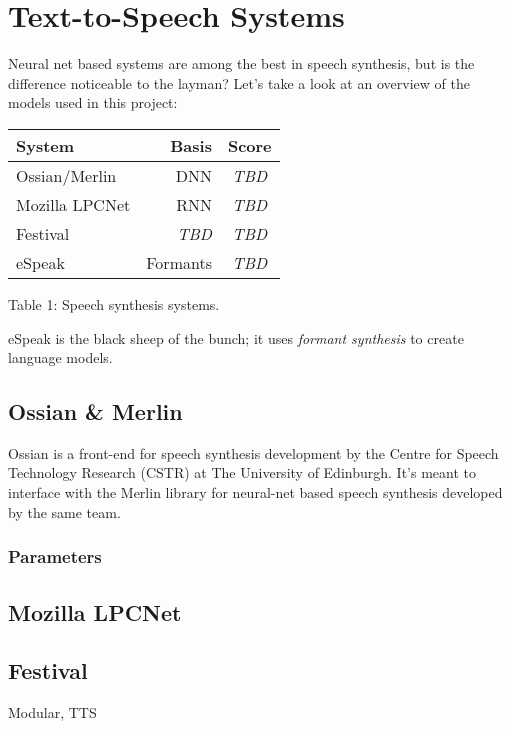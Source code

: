 \documentclass[11pt,a4paper]{article}
\begin{document}
\section{Text-to-Speech Systems}\label{sect:dnn}
Neural net based systems are among the best in speech synthesis, but is the difference noticeable to the layman? Let's take a look at an overview of the models used in this project: %
\begin{center}
	\begin{tabular}{|l|r|c|}
		\hline \bf System & \bf Basis & \bf Score \\ \hline
		Ossian/Merlin & DNN & \textit{TBD} \\
		Mozilla LPCNet & RNN & \textit{TBD} \\
		Festival & \textit{TBD} & \textit{TBD} \\
		eSpeak & Formants & \textit{TBD} \\
		\hline
	\end{tabular}

\label{font-table}Table 1: Speech synthesis systems.
\end{center}

eSpeak is the black sheep of the bunch; it uses \textit{formant synthesis} to create language models.

\subsection{Ossian \& Merlin}\label{ssec:ossian}
Ossian is a front-end for speech synthesis development by the Centre for Speech Technology Research (CSTR) at The University of Edinburgh. It's meant to interface with the Merlin library for neural-net based speech synthesis developed by the same team.

\subsubsection{Parameters}

\subsection{Mozilla LPCNet}\label{ssec:lpcnet}

\subsection{Festival}\label{ssec:festival}
Modular, TTS
\end{document}
